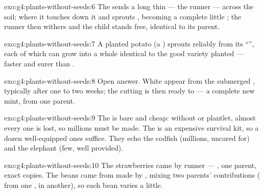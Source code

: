 \begin{solution}{exo:g4:plants-without-seeds:6}
The  sends a long thin  --- the runner --- across the
soil; where it touches down it  and sprouts ,
becoming a complete little ; the runner then withers and
the child stands free, identical to its parent.
\end{solution}

\begin{solution}{exo:g4:plants-without-seeds:7}
A planted potato (a ) sprouts reliably from its
``'', each of which can grow into a whole  identical
to the good variety planted --- faster and surer than .
\end{solution}

\begin{solution}{exo:g4:plants-without-seeds:8}
Open answer. White  appear from the submerged ,
typically after one to two weeks; the cutting is then ready to
 --- a complete new mint, from one parent.
\end{solution}

\begin{solution}{exo:g4:plants-without-seeds:9}
The  is bare and cheap: without  or plantlet,
almost every one is lost, so millions must be made. The 
is an expensive survival kit, so a dozen well-equipped ones
suffice. They echo the codfish (millions, uncared for) and
the elephant (few, well provided).
\end{solution}

\begin{solution}{exo:g4:plants-without-seeds:10}
The strawberries came by runner --- ,
one parent, exact copies. The beans came from  made by
, mixing two parents' contributions ( from one
,  in another), so each bean  varies a
little.
\end{solution}

